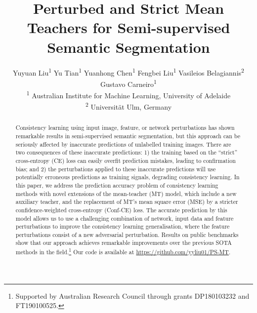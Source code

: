 \documentclass[10pt,twocolumn,letterpaper]{article}
\begin{document}
\newcommand\ChangeRT[1]{\noalign{\hrule height #1}}

\title{Perturbed and Strict Mean Teachers for Semi-supervised Semantic Segmentation}
\author{
\parbox{0.7\linewidth}{\centering  Yuyuan Liu\textsuperscript{\rm 1}  Yu Tian\textsuperscript{\rm 1}     Yuanhong Chen\textsuperscript{\rm 1}  Fengbei Liu\textsuperscript{\rm 1}    Vasileios Belagiannis\textsuperscript{\rm 2}    Gustavo Carneiro\textsuperscript{\rm 1} \\   
\textsuperscript{\rm 1} Australian Institute for Machine Learning, University of Adelaide \\
\textsuperscript{\rm 2} Universit\"at Ulm, Germany} 
}
\maketitle
\begin{abstract}

Consistency learning using input image, feature, or network perturbations has shown remarkable results in semi-supervised semantic segmentation, but this approach can be seriously affected by inaccurate predictions of unlabelled training images. There are two consequences of these inaccurate predictions: 1) the training based on the ``strict'' cross-entropy (CE) loss can easily overfit prediction mistakes, leading to confirmation bias; and 2) the perturbations applied to these inaccurate predictions will use potentially erroneous predictions as training signals, degrading consistency learning. In this paper, we address the prediction accuracy problem of consistency learning methods with novel extensions of the mean-teacher (MT) model, which include a new auxiliary teacher, and the replacement of MT's mean square error (MSE) by a stricter confidence-weighted cross-entropy (Conf-CE) loss. The accurate prediction by this model allows us to use a challenging combination of network, input data and feature perturbations to improve the consistency learning generalisation, where the feature perturbations consist of a new adversarial perturbation. Results on public benchmarks show that our approach achieves remarkable improvements over the previous SOTA methods in the field.\footnote{Supported by Australian Research Council through grants DP180103232 and FT190100525.}  Our code is available at \url{https://github.com/yyliu01/PS-MT}. \vspace{-15pt}  




  


\end{abstract}
\end{document}
